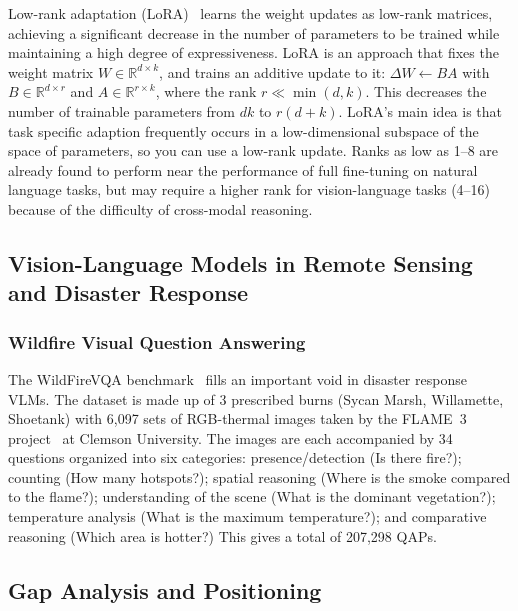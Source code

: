 \documentclass[conference]{IEEEtran}
\begin{document}
Low-rank adaptation (LoRA)~\cite{hu2022} learns the weight updates as low-rank matrices, achieving a significant decrease in the number of parameters to be trained while maintaining a high degree of expressiveness. LoRA is an approach that fixes the weight matrix $W \in \mathbb{R}^{d \times k}$, and trains an additive update to it: $\Delta W \leftarrow BA$ with $B \in \mathbb{R}^{d \times r}$ and $A \in \mathbb{R}^{r \times k}$, where the rank $r \ll \min(d,k)$. This decreases the number of trainable parameters from $dk$ to $r(d+k)$. LoRA's main idea is that task specific adaption frequently occurs in a low-dimensional subspace of the space of parameters, so you can use a low-rank update. Ranks as low as 1--8 are already found to perform near the performance of full fine-tuning on natural language tasks, but may require a higher rank for vision-language tasks (4--16) because of the difficulty of cross-modal reasoning.

\subsection{Vision-Language Models in Remote Sensing and Disaster Response}

\subsubsection{Wildfire Visual Question Answering}

The WildFireVQA benchmark~\cite{wildfirevqa} fills an important void in disaster response VLMs. The dataset is made up of 3 prescribed burns (Sycan Marsh, Willamette, Shoetank) with 6,097 sets of RGB-thermal images taken by the FLAME~3 project~\cite{flame3} at Clemson University. The images are each accompanied by 34 questions organized into six categories: presence/detection (Is there fire?); counting (How many hotspots?); spatial reasoning (Where is the smoke compared to the flame?); understanding of the scene (What is the dominant vegetation?); temperature analysis (What is the maximum temperature?); and comparative reasoning (Which area is hotter?) This gives a total of 207,298 QAPs.

\subsection{Gap Analysis and Positioning}
\end{document}
